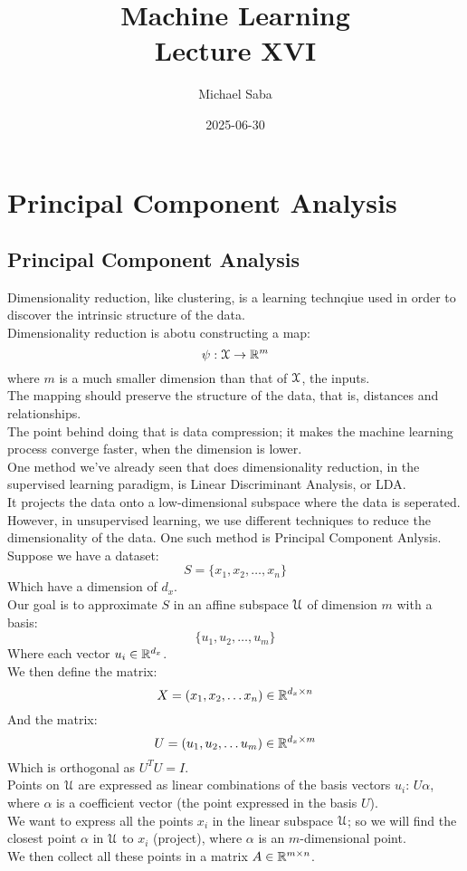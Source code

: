 \documentclass[12pt]{article}
\title{%
    \Huge Machine Learning \\
    \Large Lecture XVI
}
\date{2025-06-30}
\author{Michael Saba}
\begin{document}
\maketitle
\newpage
\setlength{\parindent}{0pt}

\section*{Principal Component Analysis}
\subsection*{Principal Component Analysis}

Dimensionality reduction, like clustering, is
a learning technqiue used in order to
discover the intrinsic structure of the data. \\

Dimensionality reduction is abotu constructing a map:
\[ \psi: \mathcal{X} \to \mathbb{R}^m \]
where $m$ is a much smaller dimension than that of $\mathcal{X}$,
the inputs. \\
The mapping should preserve the structure of the data,
that is, distances and relationships. \\

The point behind doing that is data compression;
it makes the machine learning process converge faster,
when the dimension is lower. \\

One method we've already seen that does dimensionality
reduction, in the supervised learning paradigm,
is Linear Discriminant Analysis, or LDA. \\
It projects the data onto a low-dimensional subspace
where the data is seperated. \\

However, in unsupervised learning, we use different
techniques to reduce the dimensionality of the data.
One such method is Principal Component Anlysis. \\

Suppose we have a dataset:
\[ S = \{ x_1, x_2, \dots, x_n \} \]
Which have a dimension of $d_x$. \\
Our goal is to approximate $S$ in an affine subspace
$\mathcal{U}$ of dimension $m$ with a basis:
\[ \{ u_1, u_2, \dots, u_m \} \]
Where each vector $u_i \in \mathbb{R}^{d_x}$. \\
We then define the matrix:
\[ X = (x_1, x_2, \dots x_n) \in \mathbb{R}^{d_x \times n} \]
And the matrix:
\[ U = (u_1, u_2, \dots u_m) \in \mathbb{R}^{d_x \times m} \]
Which is orthogonal as $U^TU = I$. \\
Points on $\mathcal{U}$ are expressed as linear combinations
of the basis vectors $u_i$: $U\alpha$,
where $\alpha$ is a coefficient vector
(the point expressed in the basis $U$). \\
We want to express all the points $x_i$ in the
linear subspace $\mathcal{U}$; so we will find the closest
point $\alpha$ in $\mathcal{U}$ to $x_i$ (project),
where $\alpha$ is an $m$-dimensional point. \\
We then collect all these points in a matrix
$A \in \mathbb{R}^{m \times n}$. \\
\end{document}

